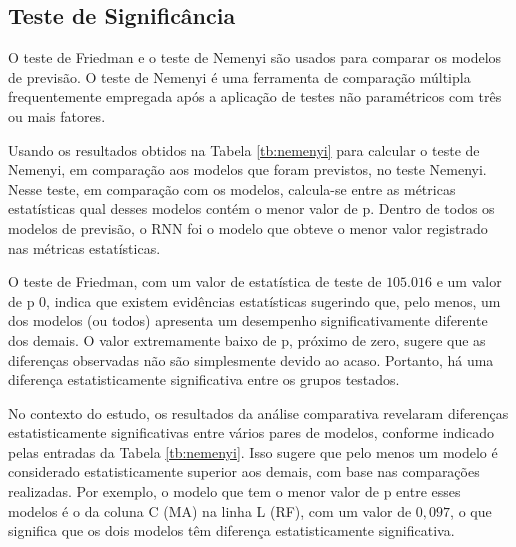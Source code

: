 \subsection{Teste de Signific\^ancia}

O teste de Friedman e o teste de Nemenyi são usados para comparar os modelos de previsão. O teste de Nemenyi é uma ferramenta de comparação múltipla frequentemente empregada após a aplicação de testes não paramétricos com três ou mais fatores.

Usando os resultados obtidos na Tabela \ref{tb:nemenyi} para calcular o teste de Nemenyi, em comparação aos modelos que foram previstos, no teste Nemenyi. Nesse teste, em comparação com os modelos, calcula-se entre as métricas estatísticas qual desses modelos contém o menor valor de p. Dentro de todos os modelos de previsão, o RNN foi o modelo que obteve o menor valor registrado nas métricas estatísticas.

O teste de Friedman, com um valor de estatística de teste de $105.016$ e um valor de p $0$, indica que existem evidências estatísticas sugerindo que, pelo menos, um dos modelos (ou todos) apresenta um desempenho significativamente diferente dos demais. O valor extremamente baixo de p, próximo de zero, sugere que as diferenças observadas não são simplesmente devido ao acaso. Portanto, há uma diferença estatisticamente significativa entre os grupos testados.

No contexto do estudo, os resultados da análise comparativa revelaram diferenças estatisticamente significativas entre vários pares de modelos, conforme indicado pelas entradas da Tabela \ref{tb:nemenyi}. Isso sugere que pelo menos um modelo é considerado estatisticamente superior aos demais, com base nas comparações realizadas. Por exemplo, o modelo que tem o menor valor de p entre esses modelos é o da coluna C (MA) na linha L (RF), com um valor de $0,097$, o que significa que os dois modelos têm diferença estatisticamente significativa.



